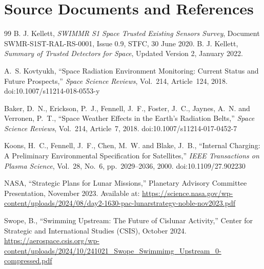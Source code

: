 \chapter*{Source Documents and References}
\begin{thebibliography}{99}
 B. J. Kellett, \textit{SWIMMR S1 Space Trusted Existing Sensors Survey}, Document SWMR-S1ST-RAL-RS-0001, Issue 0.9, STFC, 30 June 2020.
 B. J. Kellett, \textit{Summary of Trusted Detectors for Space}, Updated Version 2, January 2022.

A.~S. Kovtyukh,
``Space Radiation Environment Monitoring: Current Status and Future Prospects,''
\textit{Space Science Reviews},
Vol.~214, Article~124, 2018.
doi:10.1007/s11214-018-0553-y

Baker, D.~N., Erickson, P.~J., Fennell, J.~F., Foster, J.~C.,
Jaynes, A.~N. and Verronen, P.~T.,
``Space Weather Effects in the Earth's Radiation Belts,''
\textit{Space Science Reviews},
Vol.~214, Article~7, 2018.
doi:10.1007/s11214-017-0452-7

Koons, H.~C., Fennell, J.~F., Chen, M.~W. and Blake, J.~B.,
``Internal Charging: A Preliminary Environmental Specification for Satellites,''
\textit{IEEE Transactions on Plasma Science},
Vol.~28, No.~6, pp.~2029--2036, 2000.
doi:10.1109/27.902230

NASA,
``Strategic Plans for Lunar Missions,''
Planetary Advisory Committee Presentation,
November 2023.
Available at:
\url{https://science.nasa.gov/wp-content/uploads/2024/08/day2-1630-pac-lunarstrategy-noble-nov2023.pdf}

Swope, B.,
``Swimming Upstream: The Future of Cislunar Activity,''
Center for Strategic and International Studies (CSIS),
October 2024.
\url{https://aerospace.csis.org/wp-content/uploads/2024/10/241021_Swope_Swimmimg_Upstream_0-compressed.pdf}


\end{thebibliography}
